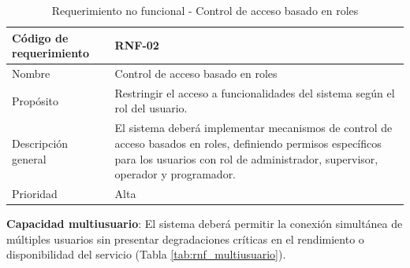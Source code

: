 \begin{table}[H]
    \centering
    \caption{Requerimiento no funcional - Control de acceso basado en roles}
    \label{tab:rnf_roles}
    \begin{tabularx}{\textwidth}{|X|X|}
        \hline
        Código de requerimiento & RNF-02                                                                                                                                                                                          \\ \hline
        Nombre                  & Control de acceso basado en roles                                                                                                                                                               \\ \hline
        Propósito               & Restringir el acceso a funcionalidades del sistema según el rol del usuario.                                                                                                                    \\ \hline
        Descripción general     & El sistema deberá implementar mecanismos de control de acceso basados en roles, definiendo permisos específicos para los usuarios con rol de administrador, supervisor, operador y programador. \\ \hline
        Prioridad               & Alta                                                                                                                                                                                            \\ \hline
    \end{tabularx}
\end{table}


\textbf{Capacidad multiusuario}: El sistema deberá permitir la conexión simultánea de múltiples usuarios sin presentar degradaciones críticas en el rendimiento o disponibilidad del servicio (Tabla \ref{tab:rnf_multiusuario}).

